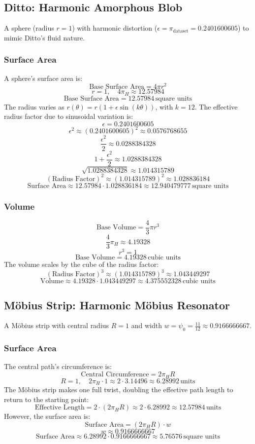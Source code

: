 \subsection{Ditto: Harmonic Amorphous Blob}
A sphere (radius \( r = 1 \)) with harmonic distortion (\(\epsilon = \pi_{\text{dataset}} = 0.2401600605\)) to mimic Ditto’s fluid nature.

\subsubsection{Surface Area}
A sphere’s surface area is:
\[
\text{Base Surface Area} = 4 \pi r^2
\]
\[
r = 1, \quad 4 \pi_H \approx 12.57984
\]
\[
\text{Base Surface Area} = 12.57984 \, \text{square units}
\]
The radius varies as \( r(\theta) = r (1 + \epsilon \sin(k\theta)) \), with \( k = 12 \). The effective radius factor due to sinusoidal variation is:
\[
\epsilon = 0.2401600605
\]
\[
\epsilon^2 \approx (0.2401600605)^2 \approx 0.0576768655
\]
\[
\frac{\epsilon^2}{2} \approx 0.0288384328
\]
\[
1 + \frac{\epsilon^2}{2} \approx 1.0288384328
\]
\[
\sqrt{1.0288384328} \approx 1.014315789
\]
\[
(\text{Radius Factor})^2 \approx (1.014315789)^2 \approx 1.028836184
\]
\[
\text{Surface Area} \approx 12.57984 \cdot 1.028836184 \approx 12.940479777 \, \text{square units}
\]

\subsubsection{Volume}
\[
\text{Base Volume} = \frac{4}{3} \pi r^3
\]
\[
\frac{4}{3} \pi_H \approx 4.19328
\]
\[
r^3 = 1
\]
\[
\text{Base Volume} = 4.19328 \, \text{cubic units}
\]
The volume scales by the cube of the radius factor:
\[
(\text{Radius Factor})^3 \approx (1.014315789)^3 \approx 1.043449297
\]
\[
\text{Volume} \approx 4.19328 \cdot 1.043449297 \approx 4.375552328 \, \text{cubic units}
\]

\subsection{Möbius Strip: Harmonic Möbius Resonator}
A Möbius strip with central radius \( R = 1 \) and width \( w = \psi_0 = \frac{11}{12} \approx 0.9166666667 \).

\subsubsection{Surface Area}
The central path’s circumference is:
\[
\text{Central Circumference} = 2 \pi_H R
\]
\[
R = 1, \quad 2 \pi_H \cdot 1 \approx 2 \cdot 3.14496 \approx 6.28992 \, \text{units}
\]
The Möbius strip makes one full twist, doubling the effective path length to return to the starting point:
\[
\text{Effective Length} = 2 \cdot (2 \pi_H R) \approx 2 \cdot 6.28992 \approx 12.57984 \, \text{units}
\]
However, the surface area is:
\[
\text{Surface Area} = (2 \pi_H R) \cdot w
\]
\[
w \approx 0.9166666667
\]
\[
\text{Surface Area} \approx 6.28992 \cdot 0.9166666667 \approx 5.76576 \, \text{square units}
\]

